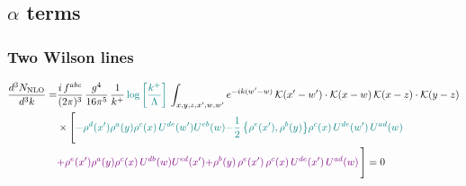 \documentclass[9pt]{article}
\numberwithin{equation}{section}
\begin{document}
\subsection{$\alpha$ terms}
\subsubsection{Two Wilson lines}
\begin{align}
\frac{d^{3}N_{\rm NLO}}{d^{3}k}= & \frac{i\,f^{abc}}{(2\pi)^{3}}\,\frac{g^{4}}{16\pi^{5}}\,\frac{1}{k^{+}}\,{\color{teal}\log{\left[\frac{k^{+}}{\Lambda}\right]}}\,\int_{x,y,z,x',w,w'}e^{-ik(w'-w)}\,\mathcal{K}(x'-w')\cdot\mathcal{K}(x-w)\,\mathcal{K}(x-z)\cdot\mathcal{K}(y-z)\notag\\
&\times\Bigg[{\color{teal}-\rho^{d}(x') \rho^{a}(y) \rho^{c}(x)\,U^{d e}(w') U^{e b}(w)}{\color{teal}-\frac{1}{2}\,\big\{\rho^{e}(x'),\rho^{b}(y)\big\}\rho^{c}(x)\,U^{de}(w')\,U^{ad}(w)}\notag \\ & {\color{violet}+\rho^{e}(x') \rho^{a}(y) \rho^{c}(x)\, U^{d b}(w) U^{e d}(x')}{\color{violet}+\rho^{b}(y)\,\rho^{e}(x')\,\rho^{c}(x)\,U^{de}(x')\,U^{ad}(w)}\,\Bigg] = 0
\end{align}
\end{document}
